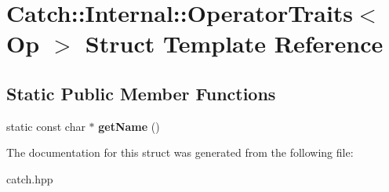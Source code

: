 \hypertarget{structCatch_1_1Internal_1_1OperatorTraits}{}\section{Catch\+:\+:Internal\+:\+:Operator\+Traits$<$ Op $>$ Struct Template Reference}
\label{structCatch_1_1Internal_1_1OperatorTraits}
\subsection*{Static Public Member Functions}
\begin{DoxyCompactItemize}
\item 
\mbox{\label{structCatch_1_1Internal_1_1OperatorTraits_ac6d08082ea33348d42bc4ccbd6d07671}} 
static const char $\ast$ {\bfseries get\+Name} ()
\end{DoxyCompactItemize}


The documentation for this struct was generated from the following file\+:\begin{DoxyCompactItemize}
\item 
catch.\+hpp\end{DoxyCompactItemize}
